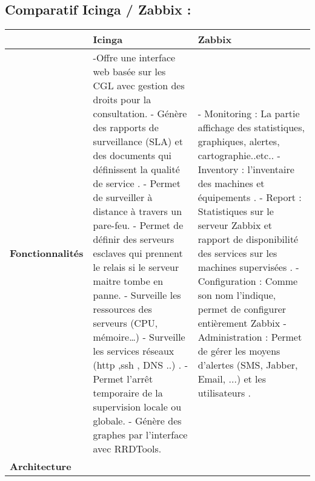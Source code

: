 	\subsection{Comparatif Icinga / Zabbix :}
\begin{tabular}{|p{3cm}|p{7cm}|p{7cm}|}
\hline
 & \bf Icinga & \bf Zabbix \\
\hline
\bf Fonctionnalités & -Offre une interface web basée sur les CGL avec gestion des droits pour la consultation.\newline 
				- Génère des rapports de surveillance (SLA) et des documents qui définissent la qualité de service . \newline
				- Permet de surveiller à distance à travers un pare-feu. \newline
				- Permet de définir des serveurs esclaves qui prennent le relais si le serveur maitre tombe en panne. \newline
				- Surveille les ressources des serveurs (CPU, mémoire…) \newline
				- Surveille les services réseaux (http ,ssh , DNS ..) . \newline
				- Permet l'arrêt temporaire de la supervision locale ou globale. \newline
				- Génère des graphes par l'interface avec RRDTools.
				& 
				- Monitoring : La partie affichage des statistiques, graphiques, alertes, cartographie..etc.. \newline
				- Inventory : l'inventaire des machines et équipements . \newline
  				- Report : Statistiques sur le serveur Zabbix et rapport de disponibilité des services sur les machines supervisées . \newline
				- Configuration : Comme son nom l'indique, permet de configurer entièrement Zabbix \newline 
				- Administration : Permet de gérer les moyens d'alertes (SMS, Jabber, Email, ...) et les utilisateurs . \\
\hline 
\bf Architecture &
 

\end{tabular}
